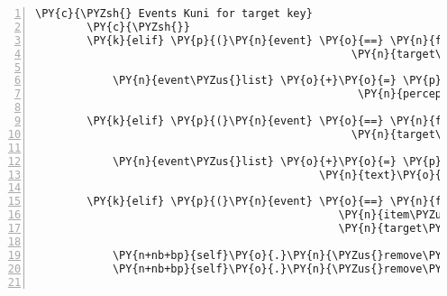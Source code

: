 \begin{Verbatim}[commandchars=\\\{\},numbers=left,firstnumber=1,stepnumber=1]
        \PY{c}{\PYZsh{} Events Kuni for target key}
        \PY{c}{\PYZsh{}}
        \PY{k}{elif} \PY{p}{(}\PY{n}{event} \PY{o}{==} \PY{n}{fabula}\PY{o}{.}\PY{n}{TriesToLookAtEvent}\PY{p}{(}\PY{n}{identifier}\PY{o}{=}\PY{n}{ID\PYZus{}KUNI}\PY{p}{,}
                                                 \PY{n}{target\PYZus{}identifier}\PY{o}{=}\PY{l+s}{\PYZsq{}}\PY{l+s}{key}\PY{l+s}{\PYZsq{}}\PY{p}{)}\PY{p}{)}\PY{p}{:}

            \PY{n}{event\PYZus{}list} \PY{o}{+}\PY{o}{=} \PY{p}{[}\PY{n}{fabula}\PY{o}{.}\PY{n}{PerceptionEvent}\PY{p}{(}\PY{n}{identifier}\PY{o}{=}\PY{n}{ID\PYZus{}KUNI}\PY{p}{,}
                                                  \PY{n}{perception}\PY{o}{=}\PY{l+s}{\PYZsq{}}\PY{l+s}{Ein goldener, kleiner alter Schlüssel.}\PY{l+s}{\PYZsq{}}\PY{p}{)}\PY{p}{]}

        \PY{k}{elif} \PY{p}{(}\PY{n}{event} \PY{o}{==} \PY{n}{fabula}\PY{o}{.}\PY{n}{TriesToPickUpEvent}\PY{p}{(}\PY{n}{identifier}\PY{o}{=}\PY{n}{ID\PYZus{}KUNI}\PY{p}{,}
                                                 \PY{n}{target\PYZus{}identifier}\PY{o}{=}\PY{l+s}{\PYZsq{}}\PY{l+s}{key}\PY{l+s}{\PYZsq{}}\PY{p}{)}\PY{p}{)}\PY{p}{:}

            \PY{n}{event\PYZus{}list} \PY{o}{+}\PY{o}{=} \PY{p}{[}\PY{n}{fabula}\PY{o}{.}\PY{n}{SaysEvent}\PY{p}{(}\PY{n}{identifier}\PY{o}{=}\PY{n}{ID\PYZus{}KUNI}\PY{p}{,}
                                            \PY{n}{text}\PY{o}{=}\PY{l+s}{\PYZsq{}}\PY{l+s}{Ich hab einen Schlüssel gefunden!}\PY{l+s}{\PYZsq{}}\PY{p}{)}\PY{p}{]}

        \PY{k}{elif} \PY{p}{(}\PY{n}{event} \PY{o}{==} \PY{n}{fabula}\PY{o}{.}\PY{n}{TriesToDropEvent}\PY{p}{(}\PY{n}{identifier}\PY{o}{=}\PY{n}{ID\PYZus{}KUNI}\PY{p}{,}
                                               \PY{n}{item\PYZus{}identifier}\PY{o}{=}\PY{l+s}{\PYZsq{}}\PY{l+s}{key}\PY{l+s}{\PYZsq{}}\PY{p}{,}
                                               \PY{n}{target\PYZus{}identifier}\PY{o}{=}\PY{l+s}{\PYZsq{}}\PY{l+s}{door}\PY{l+s}{\PYZsq{}}\PY{p}{)}\PY{p}{)}\PY{p}{:}

            \PY{n+nb+bp}{self}\PY{o}{.}\PY{n}{\PYZus{}remove\PYZus{}sentence}\PY{p}{(}\PY{n}{ID\PYZus{}CASSANDRA}\PY{p}{,} \PY{l+s}{\PYZsq{}}\PY{l+s}{Ich glaube, ich hab den Eingang zum Gnomenweg gefunden.}\PY{l+s}{\PYZsq{}}\PY{p}{)}
            \PY{n+nb+bp}{self}\PY{o}{.}\PY{n}{\PYZus{}remove\PYZus{}sentence}\PY{p}{(}\PY{n}{ID\PYZus{}KUNI}\PY{p}{,} \PY{l+s}{\PYZsq{}}\PY{l+s}{Ich hab den Eingang zum Gnomenweg gefunden! Aber er ist verschlossen.}\PY{l+s}{\PYZsq{}}\PY{p}{)}


\end{Verbatim}
